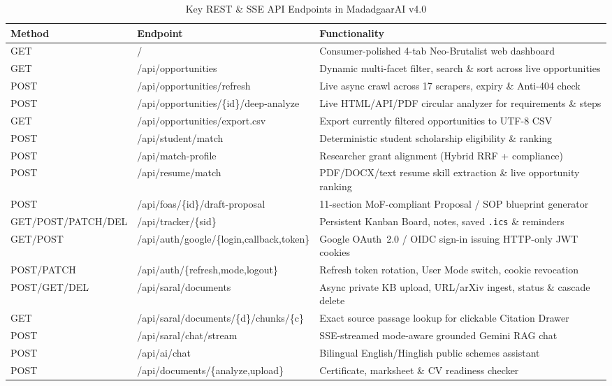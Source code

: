 \documentclass[12pt,a4paper,oneside]{report}
\begin{document}
\begin{table}[htbp]
    \centering
    \caption{Key REST \& SSE API Endpoints in MadadgaarAI v4.0}
    \label{tab:api_summary}
    \footnotesize
    \begin{tabularx}{\textwidth}{>{\ttfamily}l>{\ttfamily}lX}
        \toprule
        \textnormal{\textbf{Method}} & \textnormal{\textbf{Endpoint}} & \textnormal{\textbf{Functionality}} \\
        \midrule
        GET & / & Consumer-polished 4-tab Neo-Brutalist web dashboard \\
        GET & /api/opportunities & Dynamic multi-facet filter, search \& sort across live opportunities \\
        POST & /api/opportunities/refresh & Live async crawl across 17 scrapers, expiry \& Anti-404 check \\
        POST & /api/opportunities/\{id\}/deep-analyze & Live HTML/API/PDF circular analyzer for requirements \& steps \\
        GET & /api/opportunities/export.csv & Export currently filtered opportunities to UTF-8 CSV \\
        POST & /api/student/match & Deterministic student scholarship eligibility \& ranking \\
        POST & /api/match-profile & Researcher grant alignment (Hybrid RRF + compliance) \\
        POST & /api/resume/match & PDF/DOCX/text resume skill extraction \& live opportunity ranking \\
        POST & /api/foas/\{id\}/draft-proposal & 11-section MoF-compliant Proposal / SOP blueprint generator \\
        GET/POST/PATCH/DEL & /api/tracker/\{sid\} & Persistent Kanban Board, notes, saved \texttt{.ics} \& reminders \\
        GET/POST & /api/auth/google/\{login,callback,token\} & Google OAuth~2.0 / OIDC sign-in issuing HTTP-only JWT cookies \\
        POST/PATCH & /api/auth/\{refresh,mode,logout\} & Refresh token rotation, User Mode switch, cookie revocation \\
        POST/GET/DEL & /api/saral/documents & Async private KB upload, URL/arXiv ingest, status \& cascade delete \\
        GET & /api/saral/documents/\{d\}/chunks/\{c\} & Exact source passage lookup for clickable Citation Drawer \\
        POST & /api/saral/chat/stream & SSE-streamed mode-aware grounded Gemini RAG chat \\
        POST & /api/ai/chat & Bilingual English/Hinglish public schemes assistant \\
        POST & /api/documents/\{analyze,upload\} & Certificate, marksheet \& CV readiness checker \\
        \bottomrule
    \end{tabularx}
\end{table}
\end{document}
